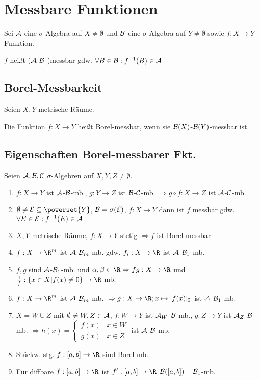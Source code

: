 \section*{Messbare Funktionen}

Sei $\mathcal{A}$ eine $\sigma$-Algebra auf $X \neq \emptyset$ und $\mathcal{B}$ eine $\sigma$-Algebra auf $Y \neq \emptyset$ sowie $f : X \to Y$ Funktion.

$f$ heißt ($\mathcal{A}$-$\mathcal{B}$-)messbar gdw. $\forall B \in \mathcal{B} : f^{-1}(B) \in \mathcal{A}$

\subsection*{Borel-Messbarkeit}

Seien $X, Y$ metrische Räume.

Die Funktion $f : X \to Y$ heißt Borel-messbar, wenn sie $\mathcal{B}(X)$-$\mathcal{B}(Y)$-messbar ist.

\subsection*{Eigenschaften Borel-messbarer Fkt.}

Seien $\mathcal{A}, \mathcal{B}, \mathcal{C}$ $\sigma$-Algebren auf $X, Y, Z \neq \emptyset$.

\begin{enumerate}[label=(\alph*)]
	\item $f : X \to Y$ ist $\mathcal{A}$-$\mathcal{B}$-mb., $g : Y \to Z$ ist $\mathcal{B}$-$\mathcal{C}$-mb. $\Rightarrow g \circ f : X \to Z$ ist $\mathcal{A}$-$\mathcal{C}$-mb.
	\item $\emptyset \neq \E \subseteq \powerset{Y}$, $\mathcal{B} = \sigma(\mathcal{E})$, $f: X \to Y$ dann ist $f$ messbar gdw. $\forall E \in \mathcal{E} : f^{-1}(E) \in \mathcal{A}$
	\item $X, Y$ metrische Räume, $f : X \to Y$ stetig $\Rightarrow f$ ist Borel-messbar
	\item $f : X \to \R^m$ ist $\mathcal{A}$-$\mathcal{B}_m$-mb. gdw. $f_i : X \to \R$ ist $\mathcal{A}$-$\mathcal{B}_1$-mb.
	\item $f, g$ sind $\mathcal{A}$-$\mathcal{B}_1$-mb. und $\alpha, \beta \in \R \Rightarrow fg : X \to \R$ und $\frac{1}{f} : \{x \in X | f(x) \neq 0\} \to \R$ mb.
	\item $f : X \to \R^m$ ist $\mathcal{A}$-$\mathcal{B}_m$-mb. $\\\Rightarrow g : X \to \R; x \mapsto |f(x)|_2$ ist $\mathcal{A}$-$\mathcal{B}_1$-mb.
	\item{
		$X = W \dot\cup Z$ mit $\emptyset \neq W, Z \in \mathcal{A}$, $f : W \to Y$ ist $\mathcal{A}_W$-$\mathcal{B}$-mb., $g : Z \to Y$ ist $\mathcal{A}_Z$-$\mathcal{B}$-mb. $\Rightarrow h(x) = \begin{cases}
			f(x) & x \in W \\
			g(x) & x \in Z
		\end{cases}$ ist $\mathcal{A}$-$\mathcal{B}$-mb.
	}
	\item Stückw. stg. $f: [a,b] \to \R$ sind Borel-mb.
	\item Für diffbare $f : [a,b] \to \R$ ist $f' : [a,b] \to \R$ $\mathcal{B}([a,b])-\mathcal{B}_1$-mb.
\end{enumerate}

